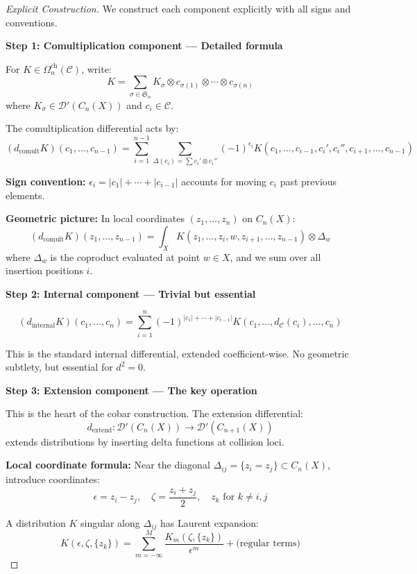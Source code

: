 \begin{proof}[Explicit Construction]
We construct each component explicitly with all signs and conventions.

\textbf{Step 1: Comultiplication component — Detailed formula}

For $K \in \Omega^{\text{ch}}_n(\mathcal{C})$, write:
$$K = \sum_{\sigma \in \mathfrak{S}_n} K_\sigma \otimes c_{\sigma(1)} \otimes \cdots 
\otimes c_{\sigma(n)}$$
where $K_\sigma \in \mathcal{D}'(C_n(X))$ and $c_i \in \mathcal{C}$.

The comultiplication differential acts by:
$$(d_{\text{comult}}K)(c_1, \ldots, c_{n-1}) = \sum_{i=1}^{n-1} \sum_{\Delta(c_i) = 
\sum c_i' \otimes c_i''} (-1)^{\epsilon_i} K(c_1, \ldots, c_{i-1}, c_i', c_i'', 
c_{i+1}, \ldots, c_{n-1})$$

\textbf{Sign convention:} $\epsilon_i = |c_1| + \cdots + |c_{i-1}|$ accounts for 
moving $c_i$ past previous elements.

\textbf{Geometric picture:} In local coordinates $(z_1, \ldots, z_n)$ on $C_n(X)$:
\[
(d_{\text{comult}}K)(z_1, \ldots, z_{n-1}) = \int_X K(z_1, \ldots, z_i, w, z_{i+1}, 
\ldots, z_{n-1}) \otimes \Delta_w
\]
where $\Delta_w$ is the coproduct evaluated at point $w \in X$, and we sum over 
all insertion positions $i$.

\textbf{Step 2: Internal component — Trivial but essential}

$$(d_{\text{internal}}K)(c_1, \ldots, c_n) = \sum_{i=1}^n (-1)^{|c_1| + \cdots + 
|c_{i-1}|} K(c_1, \ldots, d_{\mathcal{C}}(c_i), \ldots, c_n)$$

This is the standard internal differential, extended coefficient-wise. No geometric 
subtlety, but essential for $d^2 = 0$.

\textbf{Step 3: Extension component — The key operation}

This is the heart of the cobar construction. The extension differential:
\[
d_{\text{extend}}: \mathcal{D}'(C_n(X)) \to \mathcal{D}'(C_{n+1}(X))
\]
extends distributions by inserting delta functions at collision loci.

\textbf{Local coordinate formula:} Near the diagonal $\Delta_{ij} = \{z_i = z_j\} 
\subset C_n(X)$, introduce coordinates:
$$\epsilon = z_i - z_j, \quad \zeta = \frac{z_i + z_j}{2}, \quad z_k \text{ for } k 
\neq i,j$$

A distribution $K$ singular along $\Delta_{ij}$ has Laurent expansion:
$$K(\epsilon, \zeta, \{z_k\}) = \sum_{m=-\infty}^{M} \frac{K_m(\zeta, \{z_k\})}{\epsilon^m} 
+ \text{(regular terms)}$$


\end{proof}
